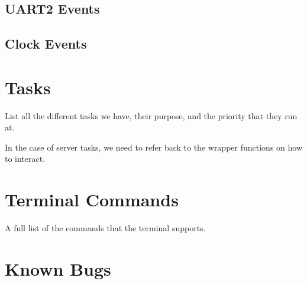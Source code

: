 \documentclass[pdftex,10pt,a4paper]{article}
\begin{document}
\subsection*{UART2 Events}
\subsection*{Clock Events}

\section*{Tasks}

List all the different tasks we have, their purpose, and the priority
that they run at.

In the case of server tasks, we need to refer back to the wrapper
functions on how to interact.

\section*{Terminal Commands}

A full list of the commands that the terminal supports.

\section*{Known Bugs}
\end{document}
